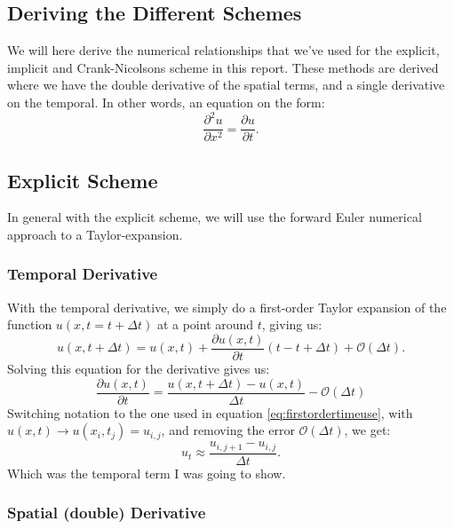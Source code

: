 \documentclass[reprint,english,notitlepage]{revtex4-1}  %
\begin{document}
\begin{appendix}

\section{Deriving the Different Schemes}\label{app:deriv}

We will here derive the numerical relationships that we've used for the explicit, implicit and Crank-Nicolsons scheme in this report. These methods are derived where we have the double derivative of the spatial terms, and a single derivative on the temporal. In other words, an equation on the form:
\begin{equation}
    \frac{\partial^2 u}{\partial x^2} = \frac{\partial u}{\partial t}.
\end{equation}
\subsection{Explicit Scheme}

In general with the explicit scheme, we will use the forward Euler numerical approach to a Taylor-expansion.

\subsubsection{Temporal Derivative}

With the temporal derivative, we simply do a first-order Taylor expansion of the function $u(x,t=t+\Delta t)$ at a point around $t$, giving us:
\begin{equation}
    u(x,t+\Delta t) = u(x,t) + \frac{\partial u(x,t)}{\partial t}(t-t+\Delta t) + \mathcal{O}(\Delta t).
\end{equation}
Solving this equation for the derivative gives us:
\begin{equation}
    \frac{\partial u(x,t)}{\partial t} = \frac{u(x,t+\Delta t)-u(x,t)}{\Delta t} - \mathcal{O}(\Delta t)
\end{equation}
Switching notation to the one used in equation \ref{eq:firstordertimeuse}, with $u(x,t) \rightarrow u(x_i,t_j) = u_{i,j}$, and removing the error $\mathcal{O}(\Delta t)$, we get:
\begin{equation}
    u_t \approx \frac{u_{i,j+1}-u_{i,j}}{\Delta t}.
\end{equation}
Which was the temporal term I was going to show.

\subsubsection{Spatial (double) Derivative}


\end{appendix}
\end{document}
